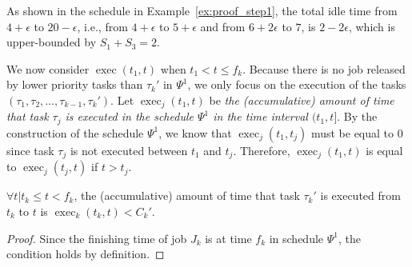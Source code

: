 \begin{example}
As shown in the schedule in Example~\ref{ex:proof_step1}, the total idle time from $4+\epsilon$ to
$20-\epsilon$, i.e., from $4+\epsilon$ to $5+\epsilon$ and from
$6+2\epsilon$ to $7$, is $2-2\epsilon$, which is upper-bounded by $S_1+S_3 = 2$. 
\end{example}

%


We now consider $\operatorname{exec}(t_1, t)$ when $t_1 < t \leq f_k$.
Because there is no job released by lower priority tasks than
$\tau_k'$ in $\Psi^1$, we only focus on the execution of the
tasks $(\tau_1, \tau_2, \ldots, \tau_{k-1}, \tau_k')$. Let
$\operatorname{exec}_j(t_1, t)$ be \emph{the
 (accumulative) amount of time that task $\tau_j$ is executed in the schedule
  $\Psi^1$ in the time interval $(t_1, t]$}. By the construction of the
schedule $\Psi^1$, we know that $\operatorname{exec}_j(t_1, t_j)$ must
be equal to $0$ since task $\tau_j$ is not executed between $t_1$ and $t_j$. %
Therefore, $\operatorname{exec}_j(t_1, t)$ is equal to
$\operatorname{exec}_j(t_j, t)$ if $t > t_j$.

\begin{Lemma}
  \label{lemma:exec-tau-k}
  $\forall t | t_k \leq t < f_k$, the (accumulative) amount of time that
  task $\tau_k'$ is executed from $t_k$ to $t$ is $\operatorname{exec}_k(t_k, t) < C_k'$.
\end{Lemma}
\begin{proof}
  Since the finishing time of job $J_k$ is at time $f_k$ in schedule $\Psi^1$, the
  condition holds by definition.
\end{proof}


